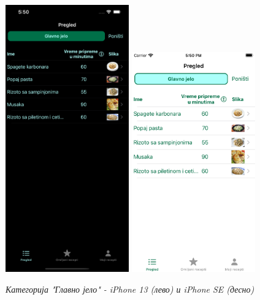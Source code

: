 \documentclass[12pt,oneside]{memoir}
\begin{document}
\begin{figure} [H]
    \centering
    \captionsetup{justification=centering}
    \includegraphics[width=0.475\textwidth]{images/simulators/view images/dark - choosen category.png}
    \hfill
    \includegraphics[width=0.475\textwidth]{images/simulators/view images/light - choosen category.png}
    \caption{\textit{Категорија "Главно јело" - iPhone 13 (лево) и iPhone SE (десно)}}
    \label{slika:изабрана_категорија_1}
\end{figure}
\end{document}
